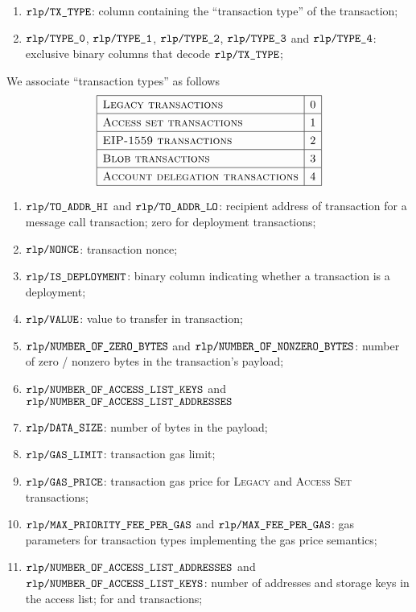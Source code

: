 \begin{enumerate}
	\item
		$\texttt{rlp} \texttt{/}{\texttt{TX\_TYPE}}$:
		column containing the ``transaction type'' of the transaction;
	\item 
		$\texttt{rlp} \texttt{/}{\texttt{\texttt{TYPE\_0}}}            $,
		$\texttt{rlp} \texttt{/}{\texttt{\texttt{TYPE\_1}}}         $,
		$\texttt{rlp} \texttt{/}{\texttt{\texttt{TYPE\_2}}}           $,
		$\texttt{rlp} \texttt{/}{\texttt{\texttt{TYPE\_3}}}              $ and
		$\texttt{rlp} \texttt{/}{\texttt{\texttt{TYPE\_4}}} $:
		exclusive binary columns that decode
		$\texttt{rlp} \texttt{/}{\texttt{TX\_TYPE}}$;
\end{enumerate}
We associate ``transaction types'' as follows
\[
	\renewcommand{\arraystretch}{1.3}
	\begin{array}{|l|c|}
		\hline
		\textsc{Legacy transactions}             & 0 \\ \hline
		\textsc{Access set transactions}         & 1 \\ \hline
		\textsc{EIP-1559 transactions}           & 2 \\ \hline
		\textsc{Blob transactions}               & 3 \\ \hline
		\textsc{Account delegation transactions} & 4 \\ \hline
	\end{array}
\]
\begin{enumerate}[resume]
	\item
		$\texttt{rlp} \texttt{/}{\texttt{TO\_ADDR\_HI}}$ and
		$\texttt{rlp} \texttt{/}{\texttt{TO\_ADDR\_LO}}$:
		recipient address of transaction for a message call transaction;
		zero for deployment transactions;
	\item
		$\texttt{rlp} \texttt{/}{\texttt{NONCE}}$:
		transaction nonce;
	\item
		$\texttt{rlp} \texttt{/}{\texttt{IS\_DEPLOYMENT}}$:
		binary column indicating whether a transaction is a deployment;
	\item
		$\texttt{rlp} \texttt{/}{\texttt{VALUE}}$:
		value to transfer in transaction;
	\item
		$\texttt{rlp} \texttt{/}{\texttt{NUMBER\_OF\_ZERO\_BYTES}}$ and
		$\texttt{rlp} \texttt{/}{\texttt{NUMBER\_OF\_NONZERO\_BYTES}}$:
		number of zero / nonzero bytes in the transaction's payload;
	\item
		$\texttt{rlp} \texttt{/}{\texttt{NUMBER\_OF\_ACCESS\_LIST\_KEYS}}$ and
		$\texttt{rlp} \texttt{/}{\texttt{NUMBER\_OF\_ACCESS\_LIST\_ADDRESSES}}$
	\item
		$\texttt{rlp} \texttt{/}{\texttt{DATA\_SIZE}}$:
		number of bytes in the payload;
	\item
		$\texttt{rlp} \texttt{/}{\texttt{GAS\_LIMIT}}$:
		transaction gas limit;
	\item
		$\texttt{rlp} \texttt{/}{\texttt{GAS\_PRICE}}$:
		transaction gas price for
		\textsc{Legacy} and
		\textsc{Access Set} transactions;
	\item
		$\texttt{rlp} \texttt{/}{\texttt{MAX\_PRIORITY\_FEE\_PER\_GAS}} $ and
		$\texttt{rlp} \texttt{/}{\texttt{MAX\_FEE\_PER\_GAS}}         $:
		gas parameters for transaction types implementing the
		\cite{EIP-1559} gas price semantics;
	\item
		$\texttt{rlp} \texttt{/}{\texttt{NUMBER\_OF\_ACCESS\_LIST\_ADDRESSES}}$
		and
		$\texttt{rlp} \texttt{/}{\texttt{NUMBER\_OF\_ACCESS\_LIST\_KEYS}}$:
		number of addresses and storage keys in the access list;
		for \cite{EIP-2929} and \cite{EIP-2930} transactions;
\end{enumerate}

